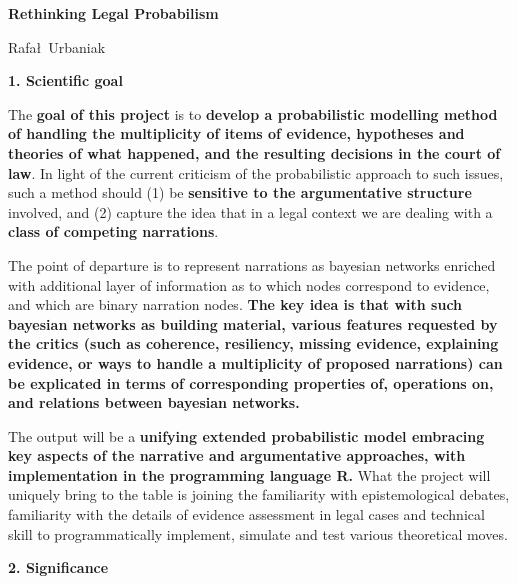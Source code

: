\documentclass[11pt,dvipsnames,enabledeprecatedfontcommands]{scrartcl}
\author{}
\date{\vspace{-2.5em}}
\begin{document}
\begin{center}
\large {\sc \textbf{Rethinking Legal Probabilism}}

\large Rafa\l\, Urbaniak
\end{center}

\vspace{1mm}

\thispagestyle{empty}

\noindent \large \textbf{1. Scientific goal} \normalsize

The \textbf{goal of this project} is to
\textbf{develop  a probabilistic  modelling method of handling the multiplicity of items of evidence,  hypotheses and theories of what happened, and the resulting decisions in the court of law}.
In light of the current criticism of the probabilistic approach to such
issues, such a method should (1) be
\textbf{sensitive to the argumentative structure} involved, and (2)
capture the idea that in a legal context we are dealing with a
\textbf{class of competing narrations}.

The point of departure is to represent narrations as bayesian networks
enriched with additional layer of information as to which nodes
correspond to evidence, and which are binary narration nodes.
\textbf{The key idea is that with such bayesian networks as building material, various features requested by the critics (such as coherence, resiliency, missing evidence,  explaining evidence, or ways to handle a multiplicity of proposed narrations) can be explicated in terms of corresponding properties of,  operations on, and relations between bayesian networks.}

The output will be a
\textbf{unifying extended probabilistic model embracing key aspects of the narrative and argumentative approaches, with  implementation in the programming language \textbf{\textsf{R}}.}
What the project will uniquely bring to the table is joining the
familiarity with epistemological debates, familiarity with the details
of evidence assessment in legal cases and technical skill to
programmatically implement, simulate and test various theoretical moves.

\vspace{2mm}

\noindent \large \textbf{2. Significance} \normalsize
\end{document}
